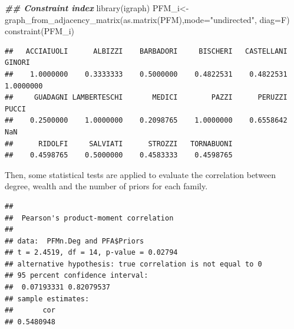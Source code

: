 \documentclass[
  notitlepage,
  onecolumn,
  openany]{book}
\newenvironment{Shaded}{\begin{snugshade}}{\end{snugshade}}
\newcommand{\AttributeTok}[1]{\textcolor[rgb]{0.77,0.63,0.00}{#1}}
\newcommand{\CommentTok}[1]{\textcolor[rgb]{0.56,0.35,0.01}{\textit{#1}}}
\newcommand{\DocumentationTok}[1]{\textcolor[rgb]{0.56,0.35,0.01}{\textbf{\textit{#1}}}}
\newcommand{\FunctionTok}[1]{\textcolor[rgb]{0.00,0.00,0.00}{#1}}
\newcommand{\NormalTok}[1]{#1}
\newcommand{\OtherTok}[1]{\textcolor[rgb]{0.56,0.35,0.01}{#1}}
\newcommand{\SpecialCharTok}[1]{\textcolor[rgb]{0.00,0.00,0.00}{#1}}
\newcommand{\StringTok}[1]{\textcolor[rgb]{0.31,0.60,0.02}{#1}}
\begin{document}
\begin{Shaded}
\begin{Highlighting}[]
\DocumentationTok{\#\# Constraint index}
\FunctionTok{library}\NormalTok{(igraph)}
\NormalTok{PFM\_i}\OtherTok{\textless{}{-}}\FunctionTok{graph\_from\_adjacency\_matrix}\NormalTok{(}\FunctionTok{as.matrix}\NormalTok{(PFM),}\AttributeTok{mode=}\StringTok{"undirected"}\NormalTok{, }\AttributeTok{diag=}\NormalTok{F)}
\FunctionTok{constraint}\NormalTok{(PFM\_i)}
\end{Highlighting}
\end{Shaded}

\begin{verbatim}
##   ACCIAIUOLI      ALBIZZI    BARBADORI     BISCHERI   CASTELLANI       GINORI 
##    1.0000000    0.3333333    0.5000000    0.4822531    0.4822531    1.0000000 
##     GUADAGNI LAMBERTESCHI       MEDICI        PAZZI      PERUZZI        PUCCI 
##    0.2500000    1.0000000    0.2098765    1.0000000    0.6558642          NaN 
##      RIDOLFI     SALVIATI      STROZZI   TORNABUONI 
##    0.4598765    0.5000000    0.4583333    0.4598765
\end{verbatim}

Then, some statistical tests are applied to evaluate the correlation between degree, wealth and the number of priors for each family.

\begin{Shaded}
\end{Shaded}

\begin{verbatim}
## 
##  Pearson's product-moment correlation
## 
## data:  PFMn.Deg and PFA$Priors
## t = 2.4519, df = 14, p-value = 0.02794
## alternative hypothesis: true correlation is not equal to 0
## 95 percent confidence interval:
##  0.07193331 0.82079537
## sample estimates:
##       cor 
## 0.5480948
\end{verbatim}

\begin{Shaded}
\end{Shaded}
\end{document}
